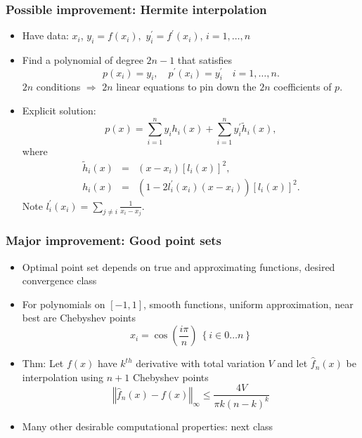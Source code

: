 \documentclass[bigger]{beamer}
\begin{document}
\begin{frame}%

\frametitle{Possible improvement: Hermite interpolation}

\begin{itemize}
\item Have data: $x_{i}$, $y_{i}=f\left( x_{i}\right) ,$ $y_{i}^{\prime
}=f^{\prime }\left( x_{i}\right) $, $i=1,\ldots ,n$

\item Find a polynomial of degree $2n-1$ that satisfies 
\begin{equation*}
p(x_{i})=y_{i},\quad p^{\prime }(x_{i})=y_{i}^{\prime }\quad i=1,\ldots ,n.
\end{equation*}%
$2n$ conditions $\Rightarrow $ $2n$ linear equations to pin down the $2n$
coefficients of $p$.

\item Explicit solution: 
\begin{equation*}
p(x)=\sum_{i=1}^{n}y_{i}h_{i}(x)+\sum_{i=1}^{n}y_{i}^{\prime }\tilde{h}%
_{i}(x),
\end{equation*}%
where 
\begin{eqnarray*}
\tilde{h}_{i}(x) &=&(x-x_{i})\left[ l_{i}(x)\right] ^{2}, \\
h_{i}(x) &=&(1-2l_{i}^{\prime }(x_{i})(x-x_{i}))\left[ l_{i}(x)\right] ^{2}.
\end{eqnarray*}%
Note $l_{i}^{\prime }(x_{i})=\sum_{j\neq i}\frac{1}{x_{i}-x_{j}}$.
\end{itemize}


\end{frame}%

\begin{frame}%

\frametitle{Major improvement: Good point sets}

\begin{itemize}
\item Optimal point set depends on true and approximating functions, desired convergence class
\item For polynomials on $\left[-1,1\right]$, smooth functions, uniform approximation, near best are Chebyshev points
\begin{equation*}
x_i=\cos(\frac{i\pi}{n})\ \left\{i\in 0 \ldots n\right\} 
\end{equation*}
\item Thm: Let $f(x)$ have $k^{th}$ derivative with total variation $V$ and let $\hat{f}_n(x)$ be interpolation using $n+1$ Chebyshev points
\begin{equation*}
\left\Vert \hat{f}_n(x)-f(x)\right\Vert_{\infty}\leq \frac{4V}{\pi k (n-k)^k} 
\end{equation*}
\item Many other desirable computational properties: next class 

\end{itemize}


\end{frame}%
\end{document}
